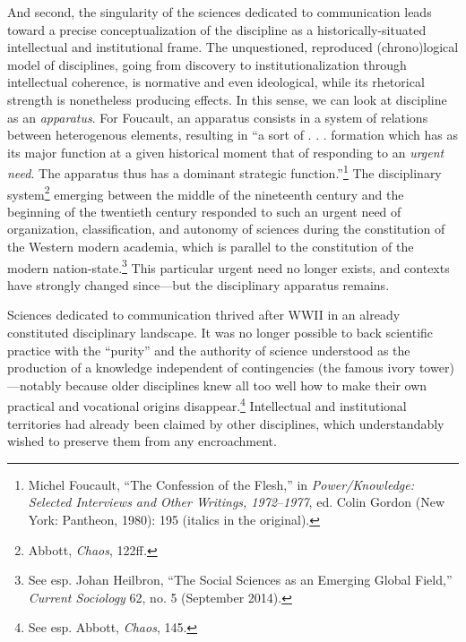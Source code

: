 \documentclass{tufte-handout}
\begin{document}
And second, the singularity of the sciences dedicated to communication
leads toward a precise conceptualization of the discipline as a
historically-situated intellectual and institutional frame. The
unquestioned, reproduced (chrono)logical model of disciplines, going
from discovery to institutionalization through intellectual coherence,
is normative and even ideological, while its rhetorical strength is
nonetheless producing effects. In this sense, we can look at discipline
as an \emph{apparatus}. For Foucault, an apparatus consists in a system
of relations between heterogenous elements, resulting in ``a sort of . .
. formation which has as its major function at a given historical moment
that of responding to an \emph{urgent need}. The apparatus thus has a
dominant strategic function.''\footnote{Michel Foucault, ``The
  Confession of the Flesh,'' in \emph{Power/Knowledge: Selected
  Interviews and Other Writings, 1972}--\emph{1977}, ed. Colin Gordon
  (New York: Pantheon, 1980): 195 (italics in the original).} The
disciplinary system\footnote{Abbott, \emph{Chaos}, 122ff\emph{.}}
emerging between the middle of the nineteenth century and the beginning
of the twentieth century responded to such an urgent need of
organization, classification, and autonomy of sciences during the
constitution of the Western modern academia, which is parallel to the
constitution of the modern nation-state.\footnote{See esp. Johan
  Heilbron, ``The Social Sciences as an Emerging Global Field,''
  \emph{Current Sociology} 62, no. 5 (September 2014).} This particular
urgent need no longer exists, and contexts have strongly changed
since---but the disciplinary apparatus remains.

Sciences dedicated to communication thrived after WWII in an already
constituted disciplinary landscape. It was no longer possible to back
scientific practice with the ``purity'' and the authority of science
understood as the production of a knowledge independent of contingencies
(the famous ivory tower)---notably because older disciplines knew all
too well how to make their own practical and vocational origins
disappear.\footnote{See esp. Abbott, \emph{Chaos}, 145.} Intellectual
and institutional territories had already been claimed by other
disciplines, which understandably wished to preserve them from any
encroachment.
\end{document}
